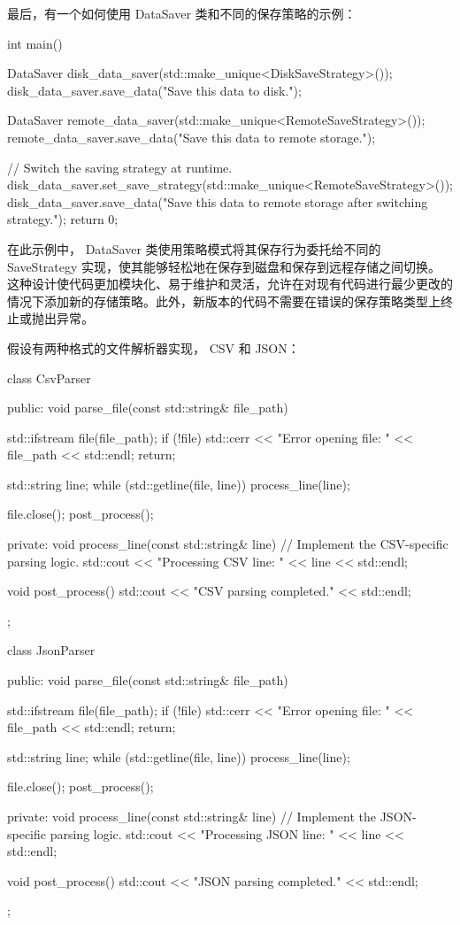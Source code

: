 最后，有一个如何使用 DataSaver 类和不同的保存策略的示例：

\begin{cpp}
int main() {
    DataSaver disk_data_saver(std::make_unique<DiskSaveStrategy>());
    disk_data_saver.save_data("Save this data to disk.");

    DataSaver remote_data_saver(std::make_unique<RemoteSaveStrategy>());
    remote_data_saver.save_data("Save this data to remote storage.");

    // Switch the saving strategy at runtime.
    disk_data_saver.set_save_strategy(std::make_unique<RemoteSaveStrategy>());
    disk_data_saver.save_data("Save this data to remote storage after switching strategy.");
    return 0;
}
\end{cpp}

在此示例中， DataSaver 类使用策略模式将其保存行为委托给不同的 SaveStrategy 实现，使其能够轻松地在保存到磁盘和保存到远程存储之间切换。这种设计使代码更加模块化、易于维护和灵活，允许在对现有代码进行最少更改的情况下添加新的存储策略。此外，新版本的代码不需要在错误的保存策略类型上终止或抛出异常。

假设有两种格式的文件解析器实现， CSV 和 JSON：

\begin{cpp}
class CsvParser {
public:
    void parse_file(const std::string& file_path) {
        std::ifstream file(file_path);
        if (!file) {
            std::cerr << "Error opening file: " << file_path << std::endl;
            return;
        }

        std::string line;
        while (std::getline(file, line)) {
            process_line(line);
        }

        file.close();
        post_process();
    }

private:
    void process_line(const std::string& line) {
        // Implement the CSV-specific parsing logic.
        std::cout << "Processing CSV line: " << line << std::endl;
    }

    void post_process() {
        std::cout << "CSV parsing completed." << std::endl;
    }
};

class JsonParser {
public:
    void parse_file(const std::string& file_path) {
        std::ifstream file(file_path);
        if (!file) {
            std::cerr << "Error opening file: " << file_path << std::endl;
            return;
        }

        std::string line;
        while (std::getline(file, line)) {
            process_line(line);
        }

        file.close();
        post_process();
    }

private:
    void process_line(const std::string& line) {
        // Implement the JSON-specific parsing logic.
        std::cout << "Processing JSON line: " << line << std::endl;
    }

    void post_process() {
        std::cout << "JSON parsing completed." << std::endl;
    }
};
\end{cpp}

